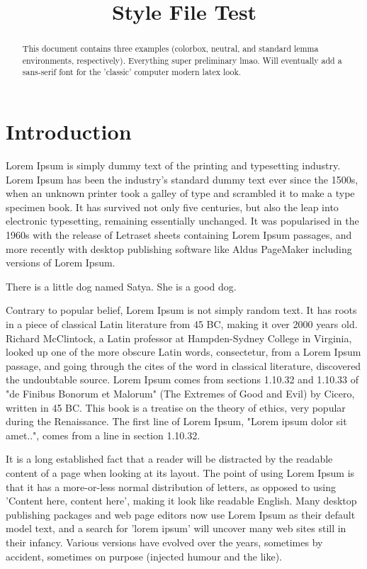\documentclass{scrartcl}
\title{Style File Test}
\begin{document}


\maketitle

\begin{abstract}
    This document contains three examples (colorbox, neutral, and standard lemma environments, respectively). Everything super preliminary lmao. Will eventually add a sans-serif font for the 'classic' computer modern latex look.

\end{abstract}

\section{Introduction}
Lorem Ipsum is simply dummy text of the printing and typesetting industry. Lorem Ipsum has been the industry's standard dummy text ever since the 1500s, when an unknown printer took a galley of type and scrambled it to make a type specimen book. It has survived not only five centuries, but also the leap into electronic typesetting, remaining essentially unchanged. It was popularised in the 1960s with the release of Letraset sheets containing Lorem Ipsum passages, and more recently with desktop publishing software like Aldus PageMaker including versions of Lorem Ipsum.

\begin{claimbox}
    There is a little dog named Satya. She is a good dog.
\end{claimbox}
Contrary to popular belief, Lorem Ipsum is not simply random text. It has roots in a piece of classical Latin literature from 45 BC, making it over 2000 years old. Richard McClintock, a Latin professor at Hampden-Sydney College in Virginia, looked up one of the more obscure Latin words, consectetur, from a Lorem Ipsum passage, and going through the cites of the word in classical literature, discovered the undoubtable source. Lorem Ipsum comes from sections 1.10.32 and 1.10.33 of "de Finibus Bonorum et Malorum" (The Extremes of Good and Evil) by Cicero, written in 45 BC. This book is a treatise on the theory of ethics, very popular during the Renaissance. The first line of Lorem Ipsum, "Lorem ipsum dolor sit amet..", comes from a line in section 1.10.32.

It is a long established fact that a reader will be distracted by the readable content of a page when looking at its layout. The point of using Lorem Ipsum is that it has a more-or-less normal distribution of letters, as opposed to using 'Content here, content here', making it look like readable English. Many desktop publishing packages and web page editors now use Lorem Ipsum as their default model text, and a search for 'lorem ipsum' will uncover many web sites still in their infancy. Various versions have evolved over the years, sometimes by accident, sometimes on purpose (injected humour and the like).
\end{document}

